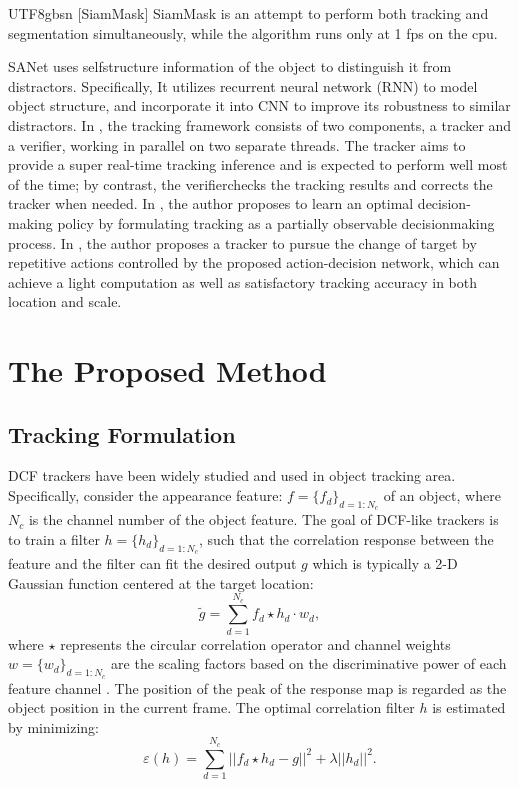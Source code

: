 \documentclass[review]{elsarticle}
\begin{document}
\begin{CJK*}{UTF8}{gbsn}
[SiamMask] SiamMask \cite{Wang2018SiamMask} is an attempt to perform both tracking and segmentation simultaneously, while the algorithm runs only at 1 fps on the cpu.

SANet \cite{Fan2016SANetSN} uses selfstructure information of the object to distinguish it from distractors. Specifically, It utilizes recurrent neural network (RNN) to model object structure, and incorporate it into CNN to improve its robustness to similar distractors. 
In \cite{fan2017parallel}, the tracking framework consists of two components, a tracker and a verifier, working in parallel on two separate threads. The tracker aims to provide a super real-time tracking inference and is expected to perform well most of the time; by contrast, the verifierchecks the tracking results and corrects the tracker when needed. 
In \cite{supancic2017tracking}, the author proposes to learn an optimal decision-making policy by formulating tracking as a partially observable decisionmaking process. 
In \cite{yun2017action}, the author proposes a tracker to pursue the change of target by repetitive actions controlled by the proposed action-decision network, which can achieve a light computation as well as satisfactory tracking accuracy in both location and scale.

\section{The Proposed Method}

\subsection{Tracking Formulation} \label{sec:InstMask}
DCF trackers \cite{Bolme2010VisualOT, Danelljan2014AccurateSE, Henriques2015HighSpeedTW, Li2014ASA} have been widely studied and used in object tracking area. Specifically, consider the appearance feature: $f=\{f_d\}_{d=1:N_c}$ of an object, where $N_c$ is the channel number of the object feature. The goal of DCF-like trackers is to train a filter $h=\{h_d\}_{d=1:N_c}$, such that the correlation response between the feature and the filter can fit the desired output $g$ which is typically a 2-D Gaussian function centered at the target location: 
\begin{equation} \label{eq:dcf}
\tilde{g}=\sum_{d=1}^{N_c}f_d \star h_d \cdot w_d,
\end{equation}
where $\star$ represents the circular correlation operator and channel weights $w = \{w_d\}_{d=1:N_c}$ are the scaling factors based on the discriminative power of each feature channel \cite{Lukezic2017DiscriminativeCF}.
The position of the peak of the response map is regarded as the object position in the current frame.
The optimal correlation filter $h$ is estimated by minimizing:
\begin{equation}
\varepsilon(h) = \sum_{d=1}^{N_c}||f_d \star h_d - g||^2+\lambda||h_d||^2.
\end{equation}


\end{CJK*}
\end{document}
